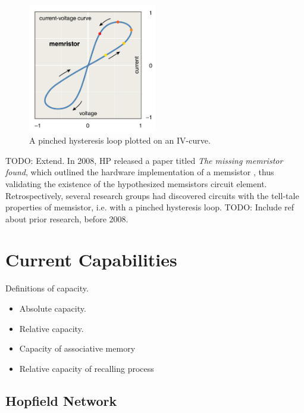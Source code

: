 \documentclass[12pt, a4paper]{article}
\begin{document}
\begin{figure}[htbp]
	\begin{center}
		\includegraphics[width=0.5\textwidth]{inc/pinched_hysteresis.png}
		\caption{A pinched hysteresis loop plotted on an IV-curve.\protect\footnotemark}
		\label{fig:pinched_hysteresis}
	\end{center}
\end{figure}

TODO: Extend. In 2008, HP released a paper titled \textit{The missing memristor found}, which outlined the hardware implementation of a memsistor \cite{hp_memristor_found}, thus validating the existence of the hypothesized memsistors circuit element. Retrospectively, several research groups had discovered circuits with the tell-tale properties of memsistor, i.e. with a pinched hysteresis loop. TODO: Include ref about prior research, before 2008.


\section{Current Capabilities}

Definitions of capacity.

\begin{itemize}
\item Absolute capacity.
\item Relative capacity.
\item Capacity of associative memory
\item Relative capacity of recalling process
\end{itemize}

\subsection{Hopfield Network}
\end{document}
